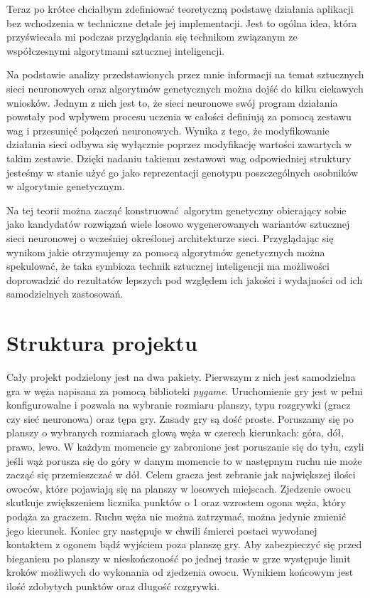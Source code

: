 \documentclass[12pt, oneside, a4paper]{report}
\begin{document}
Teraz po krótce chciałbym zdefiniować teoretyczną podstawę działania aplikacji bez wchodzenia w techniczne detale jej implementacji. Jest to ogólna idea, która przyświecała mi podczas przyglądania się technikom związanym ze współczesnymi algorytmami sztucznej inteligencji.

Na podstawie analizy przedstawionych przez mnie informacji na temat sztucznych sieci neuronowych oraz algorytmów genetycznych można dojść do kilku ciekawych wniosków. Jednym z nich jest to, że sieci neuronowe swój program działania powstały pod wpływem procesu uczenia w całości definiują za pomocą zestawu wag i przesunięć połączeń neuronowych. Wynika z tego, że modyfikowanie działania sieci odbywa się wyłącznie poprzez modyfikację wartości zawartych w takim zestawie. Dzięki nadaniu takiemu zestawowi wag odpowiedniej struktury jesteśmy w stanie użyć go jako reprezentacji genotypu poszczególnych osobników w algorytmie genetycznym.

Na tej teorii można zacząć konstruować algorytm genetyczny obierający sobie jako kandydatów rozwiązań wiele losowo wygenerowanych wariantów sztucznej sieci neuronowej o wcześniej określonej architekturze sieci. Przyglądając się wynikom jakie otrzymujemy za pomocą algorytmów genetycznych można spekulować, że taka symbioza technik sztucznej inteligencji ma możliwości doprowadzić do rezultatów lepszych pod względem ich jakości i wydajności od ich samodzielnych zastosowań.

\section{Struktura projektu}

Cały projekt podzielony jest na dwa pakiety. Pierwszym z nich jest samodzielna gra w węża napisana za pomocą biblioteki \textit{pygame}. Uruchomienie gry jest w pełni konfigurowalne i pozwala na wybranie rozmiaru planszy, typu rozgrywki (gracz czy sieć neuronowa) oraz tępa gry. Zasady gry są dość proste. Poruszamy się po planszy o wybranych rozmiarach głową węża w czerech kierunkach: góra, dół, prawo, lewo. W każdym momencie gy zabronione jest poruszanie się do tyłu, czyli jeśli wąż porusza się do góry w danym momencie to w następnym ruchu nie może zacząć się przemieszczać w dół. Celem gracza jest zebranie jak największej ilości owoców, które pojawiają się na planszy w losowych miejscach. Zjedzenie owocu skutkuje zwiększeniem licznika punktów o 1 oraz wzrostem ogona węża, który podąża za graczem. Ruchu węża nie można zatrzymać, można jedynie zmienić jego kierunek. Koniec gry następuje w chwili śmierci postaci wywołanej kontaktem z ogonem bądź wyjściem poza planszę gry. Aby zabezpieczyć się przed bieganiem po planszy w nieskończoność po jednej trasie w grze występuje limit kroków możliwych do wykonania od zjedzenia owocu. Wynikiem końcowym jest ilość zdobytych punktów oraz długość rozgrywki.
\end{document}
